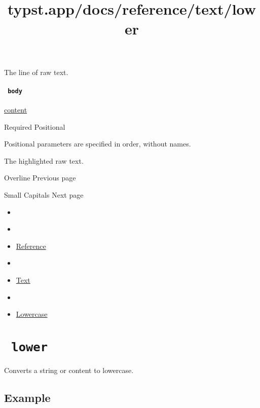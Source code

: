 The line of raw text.

\paragraph{\texorpdfstring{\texttt{\ body\ }}{ body }}\label{definitions-line-body}

\href{/docs/reference/foundations/content/}{content}

{Required} {{ Positional }}

\label{definitions-line-body-positional-tooltip}
Positional parameters are specified in order, without names.

The highlighted raw text.

\href{/docs/reference/text/overline/}{\pandocbounded{}}

{ Overline } { Previous page }

\href{/docs/reference/text/smallcaps/}{\pandocbounded{}}

{ Small Capitals } { Next page }


\title{typst.app/docs/reference/text/lower}

\begin{itemize}
\tightlist
\item
  \href{/docs}{}
\item
  
\item
  \href{/docs/reference/}{Reference}
\item
  
\item
  \href{/docs/reference/text/}{Text}
\item
  
\item
  \href{/docs/reference/text/lower/}{Lowercase}
\end{itemize}

\section{\texorpdfstring{\texttt{\ lower\ }}{ lower }}\label{summary}

Converts a string or content to lowercase.

\subsection{Example}\label{example}

